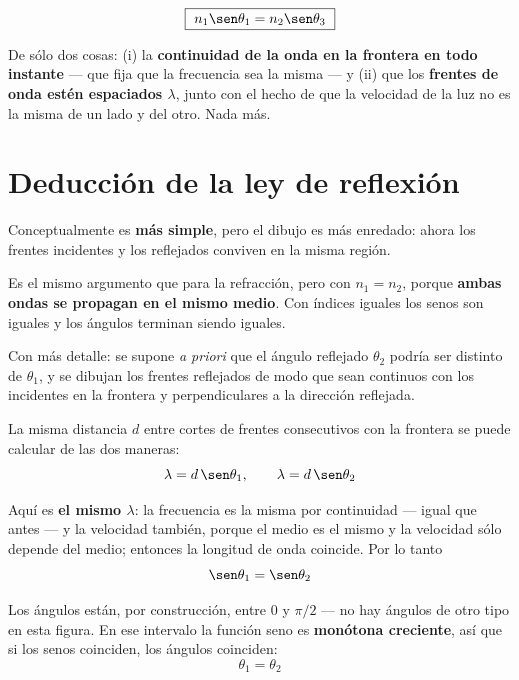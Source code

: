 \documentclass[12pt,a4paper]{article}
\begin{document}
\begin{keybox}
\[
\boxed{\ n_1 \sen\theta_1 = n_2 \sen\theta_3\ }
\]
\end{keybox}

\begin{notebox}
De sólo dos cosas: (i) la \textbf{continuidad de la onda en la frontera en todo
instante} --- que fija que la frecuencia sea la misma --- y (ii) que los
\textbf{frentes de onda estén espaciados $\lambda$}, junto con el hecho de que la
velocidad de la luz no es la misma de un lado y del otro. Nada más.
\end{notebox}

\section{Deducción de la ley de reflexión}

Conceptualmente es \textbf{más simple}, pero el dibujo es más enredado: ahora los
frentes incidentes y los reflejados conviven en la misma región.

\begin{notebox}
Es el mismo argumento que para la refracción, pero con $n_1 = n_2$, porque
\textbf{ambas ondas se propagan en el mismo medio}. Con índices iguales los senos
son iguales y los ángulos terminan siendo iguales.
\end{notebox}

Con más detalle: se supone \emph{a priori} que el ángulo reflejado $\theta_2$
podría ser distinto de $\theta_1$, y se dibujan los frentes reflejados de modo que
sean continuos con los incidentes en la frontera y perpendiculares a la dirección
reflejada.

La misma distancia $d$ entre cortes de frentes consecutivos con la frontera se
puede calcular de las dos maneras:
\[
\lambda = d\,\sen\theta_1, \qquad \lambda = d\,\sen\theta_2
\]

Aquí es \textbf{el mismo $\lambda$}: la frecuencia es la misma por continuidad
--- igual que antes --- y la velocidad también, porque el medio es el mismo y la
velocidad sólo depende del medio; entonces la longitud de onda coincide. Por lo
tanto
\[
\sen\theta_1 = \sen\theta_2
\]

\begin{keybox}
Los ángulos están, por construcción, entre $0$ y $\pi/2$ --- no hay ángulos de
otro tipo en esta figura. En ese intervalo la función seno es \textbf{monótona
creciente}, así que si los senos coinciden, los ángulos coinciden:
\[
\boxed{\ \theta_1 = \theta_2\ }
\]
\end{keybox}
\end{document}
